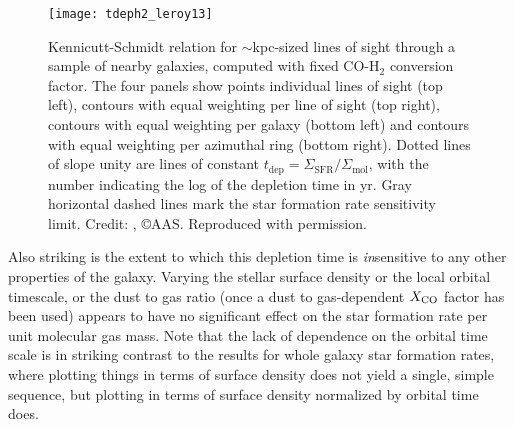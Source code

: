 \begin{figure}
\texttt{[image: tdeph2\_leroy13]}
\caption[Kennicutt-Schmidt relation for galaxies resolved at $\sim$kpc scales]{
\label{fig:tdeph2_leroy13}
Kennicutt-Schmidt relation for $\sim$kpc-sized lines of sight through a sample of nearby galaxies, computed with fixed CO-H$_2$ conversion factor. The four panels show points individual lines of sight (top left), contours with equal weighting per line of sight (top right), contours with equal weighting per galaxy (bottom left) and contours with equal weighting per azimuthal ring (bottom right). Dotted lines of slope unity are lines of constant $t_{\mathrm{dep}} = \Sigma_{\mathrm{SFR}} / \Sigma_{\mathrm{mol}}$, with the number indicating the log of the depletion time in yr. Gray horizontal dashed lines mark the star formation rate sensitivity limit. Credit: \citet{leroy13a}, \copyright AAS. Reproduced with permission.
}
\end{figure}

Also striking is the extent to which this depletion time is \textit{in}sensitive to any other properties of the galaxy.  Varying the stellar surface density or the local orbital timescale, or the dust to gas ratio (once a dust to gas-dependent $X_{\rm CO}$ factor has been used) appears to have no significant effect on the star formation rate per unit molecular gas mass. Note that the lack of dependence on the orbital time scale is in striking contrast to the results for whole galaxy star formation rates, where plotting things in terms of surface density does not yield a single, simple sequence, but plotting in terms of surface density normalized by orbital time does.

